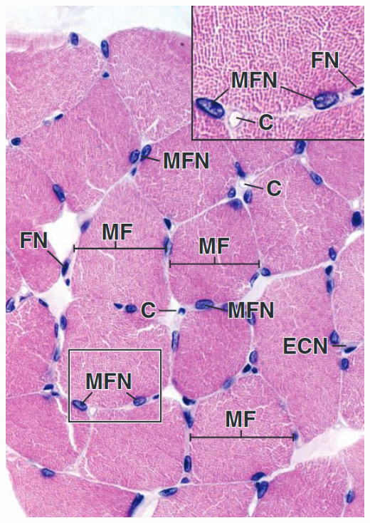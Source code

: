 \begin{itemize}
\begin{center}
    \includegraphics[scale=0.25]{images/week-1-rp5.jpg}

\end{center}
\end{itemize}
